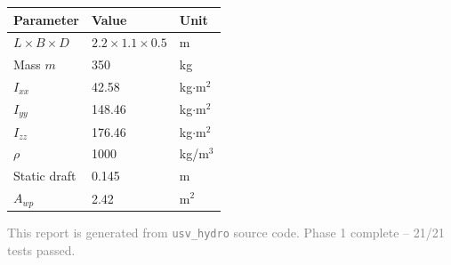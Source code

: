 \documentclass[12pt,a4paper]{article}
\begin{document}
\begin{table}[H]
  \centering
  \begin{tabular}{lll}
    \toprule
    \textbf{Parameter} & \textbf{Value} & \textbf{Unit} \\
    \midrule
    $L \times B \times D$ & $2.2\times 1.1\times 0.5$ & m \\
    Mass $m$ & 350 & kg \\
    $I_{xx}$ & 42.58 & kg$\cdot$m$^2$ \\
    $I_{yy}$ & 148.46 & kg$\cdot$m$^2$ \\
    $I_{zz}$ & 176.46 & kg$\cdot$m$^2$ \\
    $\rho$ & 1000 & kg/m$^3$ \\
    Static draft & 0.145 & m \\
    $A_{wp}$ & 2.42 & m$^2$ \\
    \bottomrule
  \end{tabular}
\end{table}

\vfill
\begin{center}
  \small\textcolor{gray}{
  This report is generated from \texttt{usv\_hydro} source code.
  Phase 1 complete -- 21/21 tests passed.
  }
\end{center}
\end{document}
